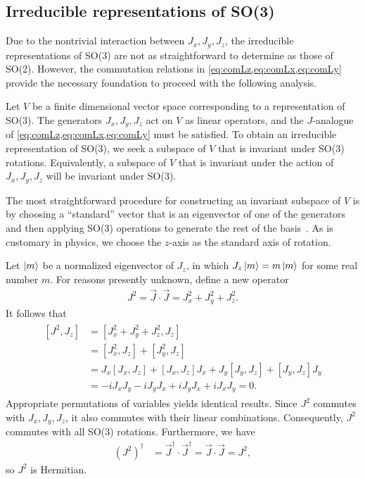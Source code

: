 \subsection{Irreducible representations of SO(3)}\label{sub:irr_SO3}
Due to the nontrivial interaction between $J_x,J_y,J_z$, the irreducible representations of SO(3) are not as straightforward to determine as those of SO(2). However, the commutation relations in \cref{eq:comLz,eq:comLx,eq:comLy} provide the necessary foundation to proceed with the following analysis.

Let $V$ be a finite dimensional vector space corresponding to a representation of SO(3). The generators $J_x,J_y,J_z$ act on $V$ as linear operators, and the $J$-analogue of \cref{eq:comLz,eq:comLx,eq:comLy} must be satisfied. To obtain an irreducible representation of SO(3), we seek a subspace of $V$ that is invariant under SO(3) rotations. Equivalently, a subspace of $V$ that is invariant under the action of $J_x,J_y,J_z$ will be invariant under SO(3).

The most straightforward procedure for constructing an invariant subspace of $V$ is by choosing a ``standard'' vector that is an eigenvector of one of the generators and then applying SO(3) operations to generate the rest of the basis~\cite{Tung1985}. As is customary in physics, we choose the $z$-axis as the standard axis of rotation.

Let $\ket{m}$ be a normalized eigenvector of $J_z$, in which $J_z\ket{m} = m\ket{m}$ for some real number $m$. For reasons presently unknown, define a new operator
\begin{align}
    J^2 = \vec{J}\cdot\vec{J} = J_x^2 + J_y^2 + J_z^2.
\end{align}
It follows that
\begin{align}
    \begin{split}        
    [J^2,J_z] 
        &= [J_x^2 + J_y^2 + J_z^2, J_z] \\
        &= [J_x^2,J_z] + [J_y^2,J_z] \\
        &= J_x [J_x,J_z] + [J_x,J_z]J_x + J_y [J_y,J_z] + [J_y,J_z]J_y \\
        &= -i J_x J_y -i J_y J_x + i J_y J_x + i J_x J_y = 0.
    \end{split}
\end{align}
Appropriate permutations of variables yields identical results. Since $J^2$ commutes with $J_x,J_y,J_z$, it also commutes with their linear combinations. Consequently, $J^2$ commutes with all SO(3) rotations. Furthermore, we have
\begin{align}
    {(J^2)}^\dagger &= \vec{J}^\dagger\cdot\vec{J}^\dagger = \vec{J}\cdot\vec{J} = J^2,
\end{align}
so $J^2$ is Hermitian.


